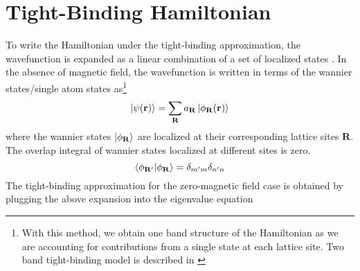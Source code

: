 \section{Tight-Binding Hamiltonian}
To write the Hamiltonian under the tight-binding approximation, the wavefunction is expanded as a linear combination of a set of localized states \cite{snoke2009solid, ashcroft2010solid}.
In the absence of magnetic field, the wavefunction is written in terms of the wannier states/single atom states as\footnote{With this method, we obtain one band structure of the Hamiltonian as  we 
are accounting for contributions from a single state at each lattice site. Two band tight-binding model is described in \cite{butler1968model}}
\begin{equation*}
 \ket{\psi(\mathbf{r})} = \sum_{\mathbf{R}}{a_{\mathbf{R}} \ket{\phi_{\mathbf{R}}(\mathbf{r})}}
\end{equation*} where the wannier states $\ket{\phi_{\mathbf{R}}}$ are localized at their corresponding lattice sites $\mathbf{R}$.
The overlap integral of wannier states localized at different sites is zero.
\begin{equation}
 \braket{\phi_{\mathbf{R}'}|\phi_{\mathbf{R}}} = \delta_{m'm}\delta_{n'n}
\end{equation}
The tight-binding approximation for the zero-magnetic field case is obtained by plugging the above expansion into the eigenvalue equation
